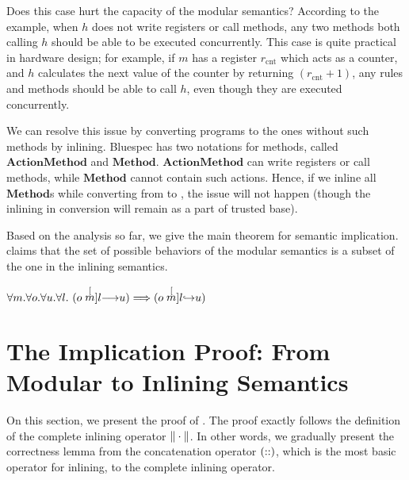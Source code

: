 Does this case hurt the capacity of the modular semantics? According
to the example, when $h$ does not write registers or call methods, any
two methods both calling $h$ should be able to be executed
concurrently. This case is quite practical in hardware design; for
example, if $m$ has a register $r_{\textrm{cnt}}$ which acts as a
counter, and $h$ calculates the next value of the counter by returning
$(r_{\textrm{cnt}} + 1)$, any rules and methods should be able to call
$h$, even though they are executed concurrently.

We can resolve this issue by converting programs to the ones without
such methods by inlining. Bluespec has two notations for methods,
called $\textbf{ActionMethod}$ and
$\textbf{Method}$. $\textbf{ActionMethod}$ can write registers or call
methods, while $\textbf{Method}$ cannot contain such actions. Hence,
if we inline all $\textbf{Method}$s while converting from \Bluespec{}
to \Kami{}, the issue will not happen (though the inlining in
conversion will remain as a part of trusted base).

Based on the analysis so far, we give the main theorem for semantic
implication.  claims that the set of possible
behaviors of the modular semantics is a subset of the one in the
inlining semantics.

\begin{theorem}
  \label{thm-modtoinl}
  \mbox{}
  \begin{center}
    \begin{math}
      \forall m.\forall o.\forall u.\forall l.\ 
      (\semstep{m}{o}{u}{l}) \Longrightarrow (\semstepin{m}{o}{u}{l})
    \end{math}
  \end{center}
\end{theorem}

\section{The Implication Proof: From Modular to Inlining Semantics}

On this section, we present the proof of . The
proof exactly follows the definition of the complete inlining operator
$\| \cdot \|$. In other words, we gradually present the
correctness lemma from the concatenation operator $(::)$,
which is the most basic operator for inlining, to the complete
inlining operator.

